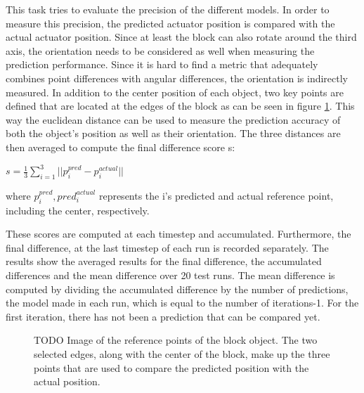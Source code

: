 This task tries to evaluate the precision of the different models. In order to measure this precision, the predicted actuator position
is compared with the actual actuator position. Since at least the block can also rotate around the third axis, the orientation needs to be
considered as well when measuring the prediction performance. Since it is hard to find a metric that adequately combines point differences with
angular differences, the orientation is indirectly measured. In addition to the center position of each object, two key points are defined that
are located at the edges of the block as can be seen in figure \ref{fig:refPoints}. This way the euclidean distance can be used to measure the
prediction accuracy of both the object's position as well as their orientation. The three distances are then averaged to compute the final difference
score s:

\begin{math}
	s = \frac{1}{3} \sum\limits_{i=1}^{3}||p^{pred}_i-p^{actual}_i||
\end{math}

where $p^{pred}_i, pred^{actual}_i$ represents the i's predicted and actual reference point, including the center, respectively.

These scores are computed at each timestep and accumulated. Furthermore, the final difference, at the last timestep of each run is recorded separately.
The results show the averaged results for the final difference, the accumulated differences and the mean difference over 20 test runs. The mean difference
is computed by dividing the accumulated difference by the number of predictions, the model made in each run, which is equal to the number of iterations-1. For the
first iteration, there has not been a prediction that can be compared yet.

\begin{figure}
	
	\caption{TODO Image of the reference points of the block object. The two selected edges, along with the center of the block, make up the three points that are used
		to compare the predicted position with the actual position.}
	\label{fig:refPoints}
\end{figure}

